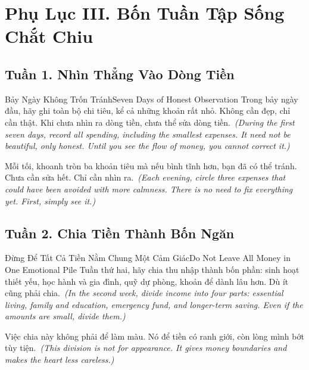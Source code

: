 \chapter*{Phụ Lục III. Bốn Tuần Tập Sống Chắt Chiu}

\section*{Tuần 1. Nhìn Thẳng Vào Dòng Tiền}
\begin{truyen}{Bảy Ngày Không Trốn Tránh}{Seven Days of Honest Observation}
Trong bảy ngày đầu, hãy ghi toàn bộ chi tiêu, kể cả những khoản rất nhỏ. Không cần đẹp, chỉ cần thật. Khi chưa nhìn ra dòng tiền, chưa thể sửa dòng tiền.\
\textit{(During the first seven days, record all spending, including the smallest expenses. It need not be beautiful, only honest. Until you see the flow of money, you cannot correct it.)}

Mỗi tối, khoanh tròn ba khoản tiêu mà nếu bình tĩnh hơn, bạn đã có thể tránh. Chưa cần sửa hết. Chỉ cần nhìn ra.\
\textit{(Each evening, circle three expenses that could have been avoided with more calmness. There is no need to fix everything yet. First, simply see it.)}
\end{truyen}

\section*{Tuần 2. Chia Tiền Thành Bốn Ngăn}
\begin{truyen}{Đừng Để Tất Cả Tiền Nằm Chung Một Cảm Giác}{Do Not Leave All Money in One Emotional Pile}
Tuần thứ hai, hãy chia thu nhập thành bốn phần: sinh hoạt thiết yếu, học hành và gia đình, quỹ dự phòng, khoản để dành lâu hơn. Dù ít cũng phải chia.\
\textit{(In the second week, divide income into four parts: essential living, family and education, emergency fund, and longer-term saving. Even if the amounts are small, divide them.)}

Việc chia này không phải để làm màu. Nó để tiền có ranh giới, còn lòng mình bớt tùy tiện.\
\textit{(This division is not for appearance. It gives money boundaries and makes the heart less careless.)}
\end{truyen}

